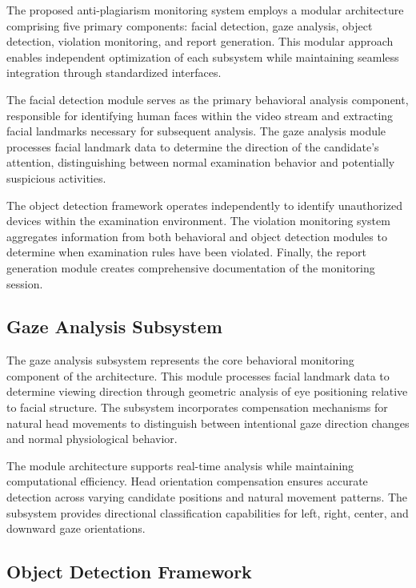 \documentclass[conference]{IEEEtran}
\begin{document}
The proposed anti-plagiarism monitoring system employs a modular architecture comprising 
five primary components: facial detection, gaze analysis, object detection, violation 
monitoring, and report generation. This modular approach enables independent optimization 
of each subsystem while maintaining seamless integration through standardized interfaces.

The facial detection module serves as the primary behavioral analysis component, responsible 
for identifying human faces within the video stream and extracting facial landmarks necessary 
for subsequent analysis. The gaze analysis module processes facial landmark data to determine 
the direction of the candidate's attention, distinguishing between normal examination behavior 
and potentially suspicious activities.

The object detection framework operates independently to identify unauthorized devices 
within the examination environment. The violation monitoring system aggregates information 
from both behavioral and object detection modules to determine when examination rules have 
been violated. Finally, the report generation module creates comprehensive documentation 
of the monitoring session.

\subsection{Gaze Analysis Subsystem}

The gaze analysis subsystem represents the core behavioral monitoring component of the 
architecture. This module processes facial landmark data to determine viewing direction 
through geometric analysis of eye positioning relative to facial structure. The subsystem 
incorporates compensation mechanisms for natural head movements to distinguish between 
intentional gaze direction changes and normal physiological behavior.

The module architecture supports real-time analysis while maintaining computational efficiency. 
Head orientation compensation ensures accurate detection across varying candidate positions 
and natural movement patterns. The subsystem provides directional classification capabilities 
for left, right, center, and downward gaze orientations.

\subsection{Object Detection Framework}
\end{document}
